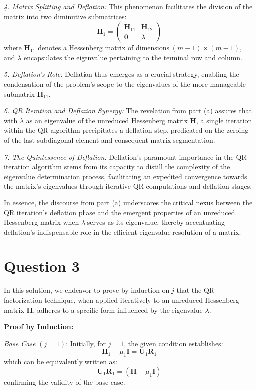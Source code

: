 \documentclass{article}
\begin{document}
\textit{4. Matrix Splitting and Deflation:}
This phenomenon facilitates the division of the matrix into two diminutive submatrices:
\begin{equation}
\boldsymbol{H}_1 = \left(\begin{array}{cc}
\boldsymbol{H}_{11} & \boldsymbol{H}_{12} \\
\mathbf{0} & \lambda
\end{array}\right)
\end{equation}
where $\boldsymbol{H}_{11}$ denotes a Hessenberg matrix of dimensions $(m-1) \times (m-1)$, and $\lambda$ encapsulates the eigenvalue pertaining to the terminal row and column.

\textit{5. Deflation's Role:}
Deflation thus emerges as a crucial strategy, enabling the condensation of the problem's scope to the eigenvalues of the more manageable submatrix $\boldsymbol{H}_{11}$.

\textit{6. QR Iteration and Deflation Synergy:}
The revelation from part (a) assures that with $\lambda$ as an eigenvalue of the unreduced Hessenberg matrix $\boldsymbol{H}$, a single iteration within the QR algorithm precipitates a deflation step, predicated on the zeroing of the last subdiagonal element and consequent matrix segmentation.

\textit{7. The Quintessence of Deflation:}
Deflation's paramount importance in the QR iteration algorithm stems from its capacity to distill the complexity of the eigenvalue determination process, facilitating an expedited convergence towards the matrix's eigenvalues through iterative QR computations and deflation stages.

In essence, the discourse from part (a) underscores the critical nexus between the QR iteration's deflation phase and the emergent properties of an unreduced Hessenberg matrix when $\lambda$ serves as its eigenvalue, thereby accentuating deflation's indispensable role in the efficient eigenvalue resolution of a matrix.

\section{Question 3}
In this solution, we endeavor to prove by induction on $j$ that the QR factorization technique, when applied iteratively to an unreduced Hessenberg matrix $\boldsymbol{H}$, adheres to a specific form influenced by the eigenvalue $\lambda$.

\textbf{Proof by Induction:}

\textit{Base Case} $(j=1)$: Initially, for $j=1$, the given condition establishes:
\begin{equation}
\boldsymbol{H}_1 - \mu_1 \mathbf{I} = \boldsymbol{U}_1 \boldsymbol{R}_1
\end{equation}
which can be equivalently written as:
\begin{equation}
\boldsymbol{U}_1 \boldsymbol{R}_1 = \left(\boldsymbol{H} - \mu_1 \mathbf{I}\right)
\end{equation}
confirming the validity of the base case.
\end{document}
